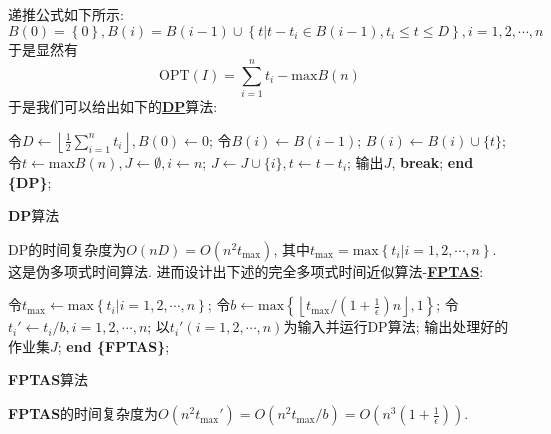 \documentclass{article}
\begin{document}
\begin{homeworkProblem}
    \solution 递推公式如下所示:$$B\left( 0 \right) =\left\{ 0 \right\} ,B\left( i \right) =B\left( i-1 \right) \cup \left\{ t\big|t-t_i\in B\left( i-1 \right) ,t_i\le t\le D \right\} ,i=1,2,\cdots ,n
    $$
    于是显然有
    $$
    \text{OPT}\left( I \right) =\sum_{i=1}^n{t_i}-\text{max} B\left( n \right) 
    $$
    于是我们可以给出如下的\hyperlink{alg:DP}{\textbf{DP}}算法:
    \begin{algorithm}[H]
		\begin{algorithmic}[1]
        \State 令$\displaystyle D\gets\left\lfloor \frac{1}{2}\sum_{i=1}^n{t_i} \right\rfloor, B(0)\gets0$;
            \State 令$B(i)\gets B(i-1)$;
                    \State $B(i)\gets B(i)\cup \{t\}$;
                \EndIf
            \EndFor
		\EndFor
        \State 令$t\gets \text{max}B(n),J\gets\emptyset,i\gets n$;
                \State $J\gets J\cup \{i\},t\gets t-t_i$;
            \EndIf
                \State 输出$J$, \textbf{break};
            \EndIf
        \EndFor
		\State \textbf{end \{DP\}};
		\end{algorithmic}
		\caption{\textbf{DP}算法}
		\label{alg:DP}
	\end{algorithm}
    DP的时间复杂度为$O(nD)=O\left( n^2t_{\text{max}} \right)$, 其中$t_{\text{max}}=\text{max}\left\{ t_i\big|i=1,2,\cdots ,n \right\}$. 这是伪多项式时间算法. 进而设计出下述的完全多项式时间近似算法-\hyperlink{alg:FPTAS}{\textbf{FPTAS}}:
    \begin{algorithm}[H]
		\begin{algorithmic}[1]
        \State 令$t_{\text{max}}\gets\text{max} \left\{ t_i|i=1,2,\cdots ,n \right\}$;
        \State 令$\displaystyle b\gets\text{max} \left\{ \left\lfloor t_{\text{max}}\bigg/\left( 1+\frac{1}{\epsilon} \right) n \right\rfloor ,1 \right\}$;
        \State 令$t_i'\gets t_i/b,i=1,2,\cdots,n$;
        \State 以$t_i'(i=1,2,\cdots,n)$为输入并运行DP算法;
        \State 输出处理好的作业集$J$;
		\State \textbf{end \{FPTAS\}};
		\end{algorithmic}
		\caption{\textbf{FPTAS}算法}
		\label{alg:FPTAS}
	\end{algorithm}
    \textbf{FPTAS}的时间复杂度为$\displaystyle O\left(n^2t_{\text{max}}'\right)=O\left( n^2 t_{\text{max}}/b\right)=O\left( n^3\left(1+\frac{1}{\epsilon}\right) \right)$.


\end{homeworkProblem}
\end{document}
